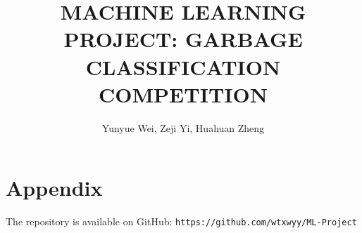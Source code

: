 \documentclass{article}
\title{MACHINE LEARNING PROJECT: GARBAGE CLASSIFICATION COMPETITION}
\author{Yunyue Wei, Zeji Yi, Huahuan Zheng}
\begin{document}
\maketitle


















\section{Appendix}
The repository is available on GitHub: \verb|https://github.com/wtxwyy/ML-Project|
\end{document}
